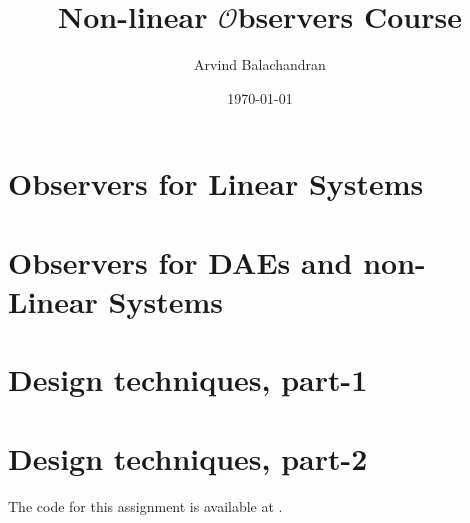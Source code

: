 \documentclass[a4paper]{book}
\title{\Large Non-linear $\mathcal{O}$bservers Course}
\author{Arvind Balachandran}
\date{\today}
\begin{document}
\maketitle
{}
\newpage
\tableofcontents
\newpage
{}

\chapter{Observers for Linear Systems}

\clearpage
 
\clearpage

\clearpage

\clearpage

\clearpage

\clearpage




\clearpage



\clearpage

\clearpage


\clearpage

\clearpage

\chapter{Observers for DAEs and non-Linear Systems}

\clearpage 

\clearpage

\clearpage

\clearpage

\clearpage

\clearpage

\clearpage


\chapter{Design techniques, part-1}


\chapter{Design techniques, part-2}
The code for this assignment is available at \href{https://github.com/arvba41/non_linear_observers/tree/main/Le4}{\faGithub\xspace}.

\clearpage

\clearpage


\end{document}
